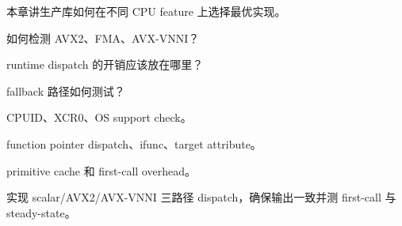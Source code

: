 {本章讲生产库如何在不同 CPU feature 上选择最优实现。}
{\item 如何检测 AVX2、FMA、AVX-VNNI？
\item runtime dispatch 的开销应该放在哪里？
\item fallback 路径如何测试？}
{\item CPUID、XCR0、OS support check。
\item function pointer dispatch、ifunc、target attribute。
\item primitive cache 和 first-call overhead。}
{实现 scalar/AVX2/AVX-VNNI 三路径 dispatch，确保输出一致并测 first-call 与 steady-state。}
